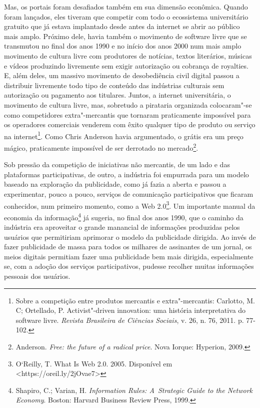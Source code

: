 Mas, os portais foram desafiados também em sua dimensão econômica.
Quando foram lançados, eles tiveram que competir com todo o ecossistema
universitário gratuito que já estava implantado desde antes da internet
se abrir ao público mais amplo. Próximo dele, havia também o movimento
de software livre que se transmutou no final dos anos 1990 e no início
dos anos 2000 num mais amplo movimento de cultura livre com produtores
de notícias, textos literários, músicas e vídeos produzindo livremente
sem exigir autorização ou cobrança de royalties. E, além deles, um
massivo movimento de desobediência civil digital passou a distribuir
livremente todo tipo de conteúdo das indústrias culturais sem
autorização ou pagamento aos titulares. Juntos, a internet
universitária, o movimento de cultura livre, mas, sobretudo a pirataria
organizada colocaram"-se como competidores extra"-mercantis que tornaram
praticamente impossível para os operadores comerciais venderem com êxito
qualquer tipo de produto ou serviço na internet\footnote{Sobre
  a competição entre produtos mercantis e extra"-mercantis: Carlotto, M.
  C; Ortellado, P. Activist"-driven innovation: uma história
  interpretativa do software livre. \emph{Revista Brasileira de Ciências
  Sociais}, v. 26, n. 76, 2011. p. 77-102.}. Como Chris Anderson havia
argumentado, o grátis era um preço mágico, praticamente impossível de
ser derrotado no mercado\footnote{Anderson. \emph{Free:
  the future of a radical price}. Nova Iorque: Hyperion, 2009.}.

Sob pressão da competição de iniciativas não mercantis, de um lado e das
plataformas participativas, de outro, a indústria foi empurrada para um
modelo baseado na exploração da publicidade, como já fazia a  aberta e
passou a experimentar, pouco a pouco, serviços de comunicação
participativos que ficaram conhecidos, num primeiro momento, como a Web
2.0\footnote{O`Reilly, T. What Is Web 2.0. 2005.
  Disponível em
  \textless{}https://oreil.ly/2jOvae7\textgreater{}}.
Um importante manual da economia da informação\footnote{Shapiro,
  C.; Varian, H. \emph{Information Rules: A~Strategic Guide to the
  Network Economy}. Boston: Harvard Business Review Press, 1999.} já
sugeria, no final dos anos 1990, que o caminho da indústria era
aproveitar o grande manancial de informações produzidas pelos usuários
que permitiriam aprimorar o modelo da publicidade dirigida. Ao invés de
fazer publicidade de massa para todos os milhares de assinantes de um
jornal, os meios digitais permitiam fazer uma publicidade bem mais
dirigida, especialmente se, com a adoção dos serviços participativos,
pudesse recolher muitas informações pessoais dos usuários.

